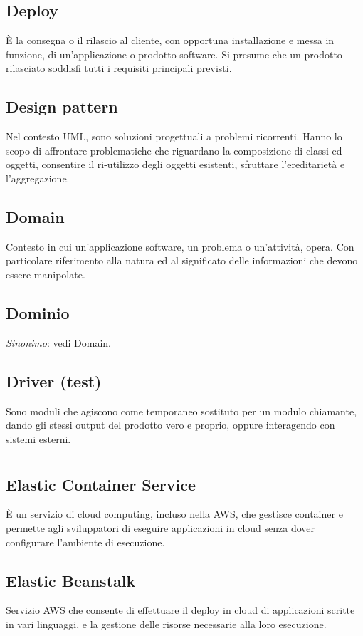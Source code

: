 	\subsection*{Deploy}
	È la consegna o il rilascio al cliente, con opportuna installazione e messa in funzione, di un’applicazione o prodotto software. Si presume che un prodotto rilasciato soddisfi tutti i requisiti principali previsti.
	\subsection*{Design pattern}
	Nel contesto UML, sono soluzioni progettuali a problemi ricorrenti. Hanno lo scopo di affrontare problematiche che riguardano la composizione di classi ed oggetti, consentire il ri-utilizzo degli oggetti esistenti, sfruttare l’ereditarietà e l’aggregazione.
	\subsection*{Domain}
	Contesto in cui un’applicazione software, un problema o un’attività, opera. Con particolare riferimento alla natura ed al significato delle informazioni che devono essere manipolate.
	\subsection*{Dominio}
	\emph{Sinonimo}: vedi Domain.
	\subsection*{Driver (test)}
	Sono moduli che agiscono come temporaneo sostituto per un modulo chiamante, dando gli stessi output del prodotto vero e proprio, oppure interagendo con sistemi esterni.
\pagebreak
\section[E]{}
	\subsection*{Elastic Container Service}
	È un servizio di cloud computing, incluso nella AWS, che gestisce container e permette agli sviluppatori di eseguire applicazioni in cloud senza dover configurare l’ambiente di esecuzione.
	\subsection*{Elastic Beanstalk}
	Servizio AWS che consente di effettuare il deploy in cloud di applicazioni scritte in vari linguaggi, e la gestione delle risorse necessarie alla loro esecuzione.

